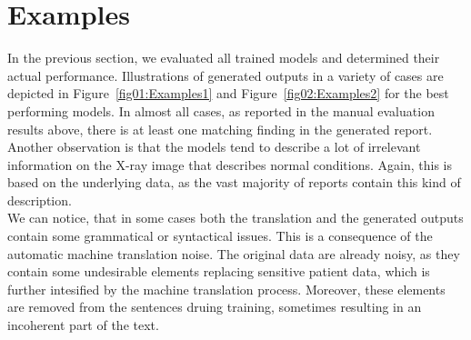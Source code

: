 \newpage
\section{Examples}
In the previous section, we evaluated all trained models and determined their actual performance. Illustrations of generated outputs in a variety of cases are depicted in Figure~\ref{fig01:Examples1} and Figure~\ref{fig02:Examples2} for the best performing models. In almost all cases, as reported in the manual evaluation results above, there is at least one matching finding in the generated report. \\

Another observation is that the models tend to describe a lot of irrelevant information on the X-ray image that describes normal conditions. Again, this is based on the underlying data, as the vast majority of reports contain this kind of description.\\

We can notice, that in some cases both the translation and the generated outputs contain some grammatical or syntactical issues. This is a consequence of the automatic machine translation noise. The original data are already noisy, as they contain some undesirable elements replacing sensitive patient data, which is further intesified by the machine translation process. Moreover, these elements are removed from the sentences druing training, sometimes resulting in an incoherent part of the text.

